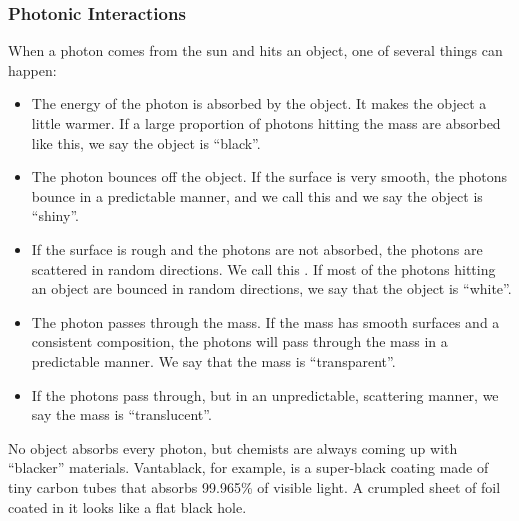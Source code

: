 \subsubsection{Photonic Interactions}
When a photon comes from the sun and hits an object, one of several
things can happen:

\begin{itemize}

  \item The energy of the photon is absorbed by the object. It makes the
        object a little warmer. If a large proportion of photons hitting the
        mass are absorbed like this, we say the object is ``black''.

  \item The photon bounces off the object. If the surface is very
        smooth, the photons bounce in a predictable manner, and we call
        this  and we say the object is ``shiny''.

  \item If the surface is rough and the photons are not absorbed, the
        photons are scattered in random directions. We call this
        . If most of the photons hitting an object are
        bounced in random directions, we say that the object is ``white''.

  \item The photon passes through the mass. If the mass has smooth
        surfaces and a consistent composition, the photons will pass through the
        mass in a predictable manner. We say that the mass is ``transparent''.

  \item If the photons pass through, but in an unpredictable,
        scattering manner, we say the mass is ``translucent''. 

\end{itemize}

No object absorbs every photon, but chemists are always coming up with
``blacker'' materials. Vantablack, for example, is a super-black coating made of tiny carbon
tubes that absorbs 99.965\% of visible light. A crumpled sheet of foil
coated in it looks like a flat black hole.

